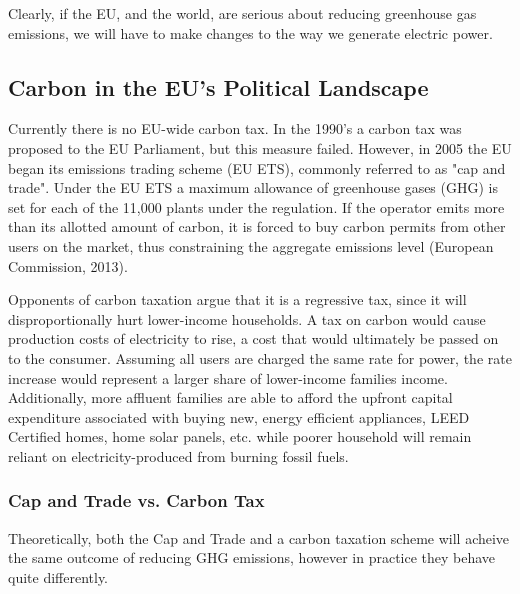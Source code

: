 \documentclass{article}
\begin{document}
Clearly, if the EU, and the world, are serious about reducing greenhouse gas emissions, we will have to make changes to the way we generate electric power.

\subsection{Carbon in the EU's Political Landscape}

Currently there is no EU-wide carbon tax. In the 1990's a carbon tax was proposed to the EU Parliament, but this measure failed. However, in 2005 the EU began its emissions trading scheme (EU ETS), commonly referred to as "cap and trade". Under the EU ETS a maximum allowance of greenhouse gases (GHG) is set for each of the 11,000 plants under the regulation. If the operator emits more than its allotted amount of carbon, it is forced to buy carbon permits from other users on the market, thus constraining the aggregate emissions level (European Commission, 2013). \*

Opponents of carbon taxation argue that it is a regressive tax, since it will disproportionally hurt lower-income households. A tax on carbon would cause production costs of electricity to rise, a cost that would ultimately be passed on to the consumer. Assuming all users are charged the same rate for power, the rate increase would represent a larger share of lower-income families income. Additionally, more affluent families are able to afford the upfront capital expenditure associated with buying new, energy efficient appliances, LEED Certified homes, home solar panels, etc. while poorer household will remain reliant on electricity-produced from burning fossil fuels.

\subsubsection{Cap and Trade vs. Carbon Tax}
Theoretically, both the Cap and Trade and a carbon taxation scheme will acheive the same outcome of reducing GHG emissions, however in practice they behave quite differently. 
\end{document}
